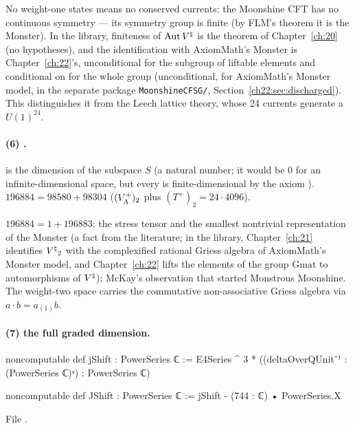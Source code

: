 \begin{physics}
No weight-one states means no conserved currents: the Moonshine CFT has no continuous symmetry —
its symmetry group is finite (by FLM's theorem it is the Monster).  In the library, finiteness of $\operatorname{Aut}{V^{\natural}}$ is the
theorem  of Chapter~\ref{ch:20} (no hypotheses), and the identification with AxiomMath's
Monster is Chapter~\ref{ch:22}'s, unconditional for the subgroup of liftable elements and conditional on
 for the whole group (unconditional, for AxiomMath's Monster model, in the separate package
\texttt{MoonshineCFSG/}, Section~\ref{ch22:sec:discharged}).  This distinguishes it from the Leech lattice theory, whose 24
currents generate a $U(1)^{24}$.
\end{physics}

\paragraph{(6) .}   is the dimension
of the subspace $S$ (a natural number; it would be $0$ for an infinite-dimensional space, but every
 is finite-dimensional by the axiom ).  $196884=98580+98304$
($(V_{\Lambda}^+)_2$ plus $(T^+)_2=24\cdot4096$).

\begin{physics}
$196884=1+196883$: the stress tensor and the smallest nontrivial representation of the Monster
(a fact from the literature; in the library, Chapter~\ref{ch:21} identifies ${V^{\natural}}_2$ with the complexified
rational Griess algebra of AxiomMath's Monster model, and Chapter~\ref{ch:22} lifts the elements of the group
$\mathrm{Gmat}$ to automorphisms of ${V^{\natural}}$);
McKay's observation that started Monstrous Moonshine.  The weight-two space carries the
commutative non-associative Griess algebra via $a\cdot b=a_{(1)}b$.
\end{physics}

\paragraph{(7) the full graded dimension.}
\begin{leancode}
noncomputable def jShift : PowerSeries ℂ :=
  E4Series ^ 3 * ((deltaOverQUnit⁻¹ : (PowerSeries ℂ)ˣ) : PowerSeries ℂ)

noncomputable def JShift : PowerSeries ℂ := jShift - (744 : ℂ) • PowerSeries.X
\end{leancode}
File .

